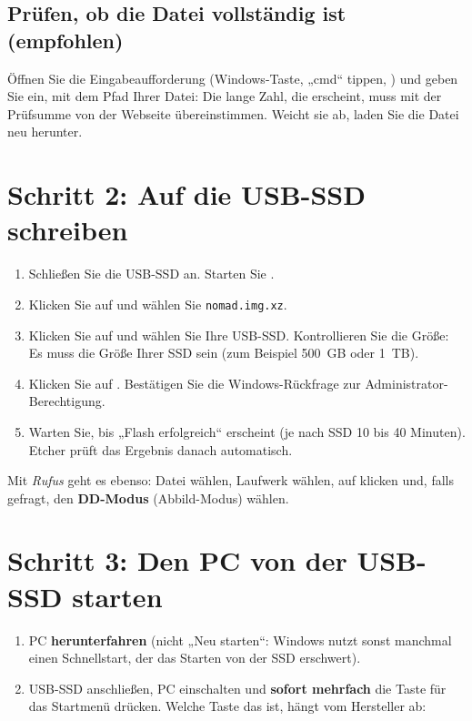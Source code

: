 \subsection*{Prüfen, ob die Datei vollständig ist (empfohlen)}
Öffnen Sie die Eingabeaufforderung (Windows-Taste, „cmd“ tippen, ) und geben Sie ein, mit dem Pfad Ihrer Datei:
Die lange Zahl, die erscheint, muss mit der Prüfsumme von der Webseite übereinstimmen. Weicht sie ab, laden Sie die Datei neu herunter.

\section{Schritt 2: Auf die USB-SSD schreiben}
\begin{enumerate}[leftmargin=1.5em,itemsep=3pt]
\item Schließen Sie die USB-SSD an. Starten Sie .
\item Klicken Sie auf  und wählen Sie \texttt{nomad.img.xz}.
\item Klicken Sie auf  und wählen Sie Ihre USB-SSD. Kontrollieren Sie die Größe: Es muss die Größe Ihrer SSD sein (zum Beispiel 500~GB oder 1~TB).
\item Klicken Sie auf . Bestätigen Sie die Windows-Rückfrage zur Administrator-Berechtigung.
\item Warten Sie, bis „Flash erfolgreich“ erscheint (je nach SSD 10 bis 40 Minuten). Etcher prüft das Ergebnis danach automatisch.
\end{enumerate}


Mit \emph{Rufus} geht es ebenso: Datei wählen, Laufwerk wählen, auf  klicken und, falls gefragt, den \textbf{DD-Modus} (Abbild-Modus) wählen.

\section{Schritt 3: Den PC von der USB-SSD starten}
\begin{enumerate}[leftmargin=1.5em,itemsep=3pt]
\item PC \textbf{herunterfahren} (nicht „Neu starten“: Windows nutzt sonst manchmal einen Schnellstart, der das Starten von der SSD erschwert).
\item USB-SSD anschließen, PC einschalten und \textbf{sofort mehrfach} die Taste für das Startmenü drücken. Welche Taste das ist, hängt vom Hersteller ab:
\end{enumerate}

